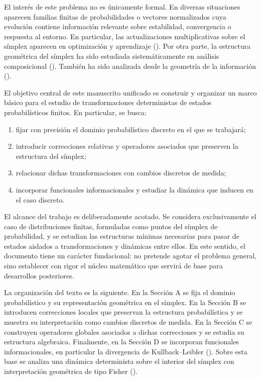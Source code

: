 ﻿\documentclass[12pt]{article}
\begin{document}
El interés de este problema no es únicamente formal. En diversas situaciones aparecen familias finitas de probabilidades o vectores normalizados cuya evolución contiene información relevante sobre estabilidad, convergencia o respuesta al entorno. En particular, las actualizaciones multiplicativas sobre el símplex aparecen en optimización y aprendizaje (\cite{KivinenWarmuth1997}). Por otra parte, la estructura geométrica del símplex ha sido estudiada sistemáticamente en análisis composicional (\cite{Aitchison1986}). También ha sido analizada desde la geometría de la información (\cite{AmariNagaoka2000}).

El objetivo central de este manuscrito unificado es construir y organizar un marco básico para el estudio de transformaciones deterministas de estados probabilísticos finitos. En particular, se busca:
\begin{enumerate}
    \item fijar con precisión el dominio probabilístico discreto en el que se trabajará;
    \item introducir correcciones relativas y operadores asociados que preserven la estructura del símplex;
    \item relacionar dichas transformaciones con cambios discretos de medida;
    \item incorporar funcionales informacionales y estudiar la dinámica que inducen en el caso discreto.
\end{enumerate}

El alcance del trabajo es deliberadamente acotado. Se considera exclusivamente el caso de distribuciones finitas, formuladas como puntos del símplex de probabilidad, y se estudian las estructuras mínimas necesarias para pasar de estados aislados a transformaciones y dinámicas entre ellos. En este sentido, el documento tiene un carácter fundacional: no pretende agotar el problema general, sino establecer con rigor el núcleo matemático que servirá de base para desarrollos posteriores.

La organización del texto es la siguiente. En la Sección A se fija el dominio probabilístico y su representación geométrica en el símplex. En la Sección B se introducen correcciones locales que preservan la estructura probabilística y se muestra su interpretación como cambios discretos de medida. En la Sección C se construyen operadores globales asociados a dichas correcciones y se estudia su estructura algebraica. Finalmente, en la Sección D se incorporan funcionales informacionales, en particular la divergencia de Kullback--Leibler (\cite{KullbackLeibler1951}). Sobre esta base se analiza una dinámica determinista sobre el interior del símplex con interpretación geométrica de tipo Fisher (\cite{Amari2016}).
\end{document}
